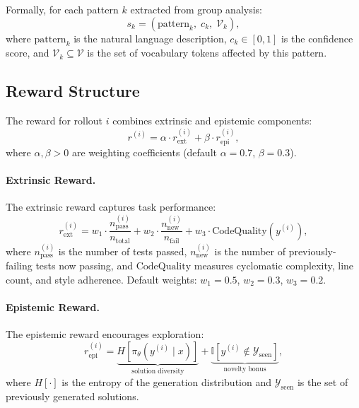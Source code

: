 Formally, for each pattern $k$ extracted from group analysis:
\begin{equation}
    s_k = \left(\text{pattern}_k, \; c_k, \; \mathcal{V}_k\right),
\end{equation}
where $\text{pattern}_k$ is the natural language description, $c_k \in [0, 1]$
is the confidence score, and $\mathcal{V}_k \subseteq \mathcal{V}$ is the set
of vocabulary tokens affected by this pattern.

\subsection{Reward Structure}

The reward for rollout $i$ combines extrinsic and epistemic components:
\begin{equation}
    r^{(i)} = \alpha \cdot r_{\text{ext}}^{(i)} + \beta \cdot r_{\text{epi}}^{(i)},
    \label{eq:reward}
\end{equation}
where $\alpha, \beta > 0$ are weighting coefficients (default $\alpha = 0.7$,
$\beta = 0.3$).

\paragraph{Extrinsic Reward.}
The extrinsic reward captures task performance:
\begin{equation}
    r_{\text{ext}}^{(i)} = w_1 \cdot \frac{n_{\text{pass}}^{(i)}}{n_{\text{total}}}
                         + w_2 \cdot \frac{n_{\text{new}}^{(i)}}{n_{\text{fail}}}
                         + w_3 \cdot \text{CodeQuality}(y^{(i)}),
\end{equation}
where $n_{\text{pass}}^{(i)}$ is the number of tests passed, $n_{\text{new}}^{(i)}$
is the number of previously-failing tests now passing, and
$\text{CodeQuality}$ measures cyclomatic complexity, line count, and style
adherence. Default weights: $w_1 = 0.5$, $w_2 = 0.3$, $w_3 = 0.2$.

\paragraph{Epistemic Reward.}
The epistemic reward encourages exploration:
\begin{equation}
    r_{\text{epi}}^{(i)} = \underbrace{H[\pi_\theta(y^{(i)} \mid x)]}_{\text{solution diversity}}
    + \underbrace{\mathbb{I}[y^{(i)} \notin \mathcal{Y}_{\text{seen}}]}_{\text{novelty bonus}},
\end{equation}
where $H[\cdot]$ is the entropy of the generation distribution and
$\mathcal{Y}_{\text{seen}}$ is the set of previously generated solutions.

